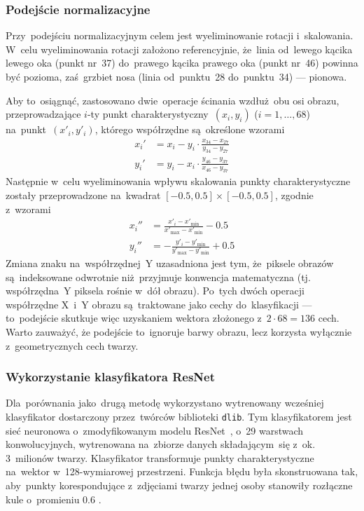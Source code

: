 \documentclass[11pt,a4paper]{article}
\begin{document}
\subsubsection{Podejście normalizacyjne}

Przy~podejściu normalizacyjnym celem jest wyeliminowanie rotacji i~skalowania.
W~celu wyeliminowania rotacji założono referencyjnie, że~linia od~lewego kącika lewego oka (punkt nr~37) do~prawego kącika prawego oka (punkt nr~46) powinna być pozioma, zaś~grzbiet nosa (linia od~punktu~28 do~punktu~34) --- pionowa.

Aby to~osiągnąć, zastosowano dwie~operacje ścinania wzdłuż~obu osi obrazu, przeprowadzające $i$-ty punkt charakterystyczny~$(x_i, y_i)$ ($i = 1,\dots,68$) na~punkt~$(x'_i, y'_i)$, którego współrzędne są~określone wzorami
\begin{align*}
    x_i' &= x_i - y_i \cdot \frac{x_{34} - x_{27}}{y_{34} - y_{27}} \\
    y_i' &= y_i - x_i \cdot \frac{y_{46} - y_{37}}{x_{46} - y_{37}}
\end{align*}
Następnie w~celu wyeliminowania wpływu skalowania punkty charakterystyczne zostały przeprowadzone na~kwadrat $[-0.5, 0.5] \times [-0.5, 0.5]$, zgodnie z~wzorami
\begin{align*}
    x_i'' &= \frac{x'_i - x'_{\min}}{x'_{\max} - x'_{\min}} - 0.5 \\
    y_i'' &= -\frac{y'_i - y'_{\min}}{y'_{\max} - y'_{\min}} + 0.5
\end{align*}
Zmiana znaku na~współrzędnej~Y uzasadniona jest tym, że~piksele obrazów są~indeksowane odwrotnie niż~przyjmuje konwencja matematyczna (tj. współrzędna~Y piksela rośnie w~dół obrazu).
Po~tych dwóch operacji współrzędne X~i~Y obrazu są~traktowane jako cechy do~klasyfikacji --- to~podejście skutkuje więc uzyskaniem wektora złożonego z~$2 \cdot 68 = 136$ cech.
Warto zauważyć, że podejście to~ignoruje barwy obrazu, lecz korzysta wyłącznie z~geometrycznych cech twarzy.

\subsubsection{Wykorzystanie klasyfikatora ResNet}

Dla~porównania jako~drugą metodę wykorzystano wytrenowany wcześniej klasyfikator dostarczony przez~twórców biblioteki \texttt{dlib}.
Tym klasyfikatorem jest sieć neuronowa o~zmodyfikowanym modelu ResNet~\cite{he2015}, o~29 warstwach konwolucyjnych, wytrenowana na~zbiorze danych składającym~się z~ok. 3~milionów twarzy.
Klasyfikator transformuje punkty charakterystyczne na~wektor w~128-wymiarowej przestrzeni.
Funkcja błędu była skonstruowana tak, aby~punkty korespondujące z~zdjęciami twarzy jednej osoby stanowiły rozłączne kule o~promieniu 0.6 \cite{king2015}.
\end{document}
